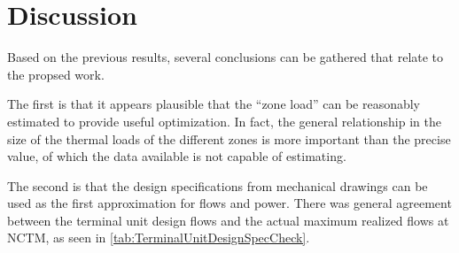 \section{Discussion}

Based on the previous results, several conclusions can be gathered that relate to the propsed work.

The first is that it appears plausible that the ``zone load'' can be reasonably estimated to provide useful optimization. In fact, the general relationship in the size of the thermal loads of the different zones is more important than the precise value, of which the data available is not capable of estimating. 

The second is that the design specifications from mechanical drawings can be used as the first approximation for flows and power. There was general agreement between the terminal unit design flows and the actual maximum realized flows at NCTM, as seen in \tableref{} \ref{tab:TerminalUnitDesignSpecCheck}. 
